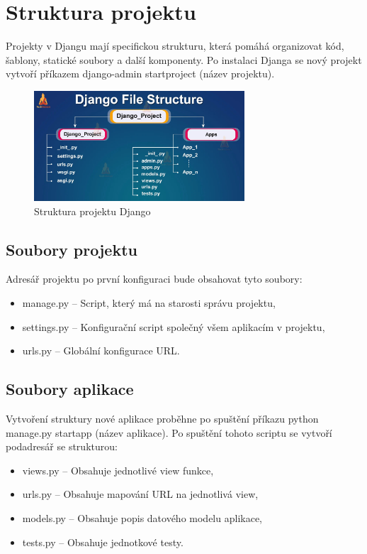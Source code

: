 \documentclass[12pt, a4paper,
twoside,        %
openright
]{report}
\begin{document}
\section{Struktura projektu}
\label{strukturaprojektu}

Projekty v Djangu mají specifickou strukturu, která pomáhá organizovat kód, šablony, statické soubory a další komponenty. Po instalaci Djanga se nový projekt vytvoří příkazem django-admin startproject (název projektu).
	\begin{figure}[h!]
		\centering
		\includegraphics[width=0.7\textwidth]{image/django-struktura.jpg}
		\caption{Struktura projektu Django}
		\label{fig:djangostruktura}
	\end{figure}
\subsection{Soubory projektu}
Adresář projektu po první konfiguraci bude obsahovat tyto soubory:
\begin{itemize}
	\item manage.py – Script, který má na starosti správu projektu,
	\item settings.py – Konfigurační script společný všem aplikacím v projektu,
	\item urls.py – Globální konfigurace URL.
\end{itemize}
\subsection{Soubory aplikace}
Vytvoření struktury nové aplikace proběhne po spuštění příkazu python manage.py startapp (název aplikace). Po spuštění tohoto scriptu se vytvoří podadresář se strukturou:
\begin{itemize}
	\item views.py – Obsahuje jednotlivé view funkce,
	\item urls.py – Obsahuje mapování URL na jednotlivá view,
	\item models.py – Obsahuje popis datového modelu aplikace,
	\item tests.py – Obsahuje jednotkové testy.
\end{itemize}
\end{document}
